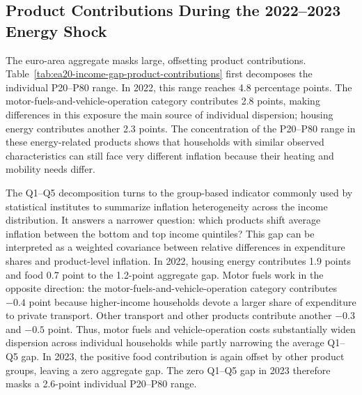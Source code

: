 \documentclass[11pt]{article}
\begin{document}
\subsection{Product Contributions During the 2022--2023 Energy Shock}



The euro-area aggregate masks large, offsetting product contributions.
Table~\ref{tab:ea20-income-gap-product-contributions} first decomposes the individual P20--P80
range. In 2022, this range reaches 4.8 percentage points. The motor-fuels-and-vehicle-operation
category contributes 2.8 points, making differences in this exposure the main source of
individual dispersion; housing energy contributes another 2.3 points. The concentration of the
P20--P80 range in these
energy-related products shows that households with similar observed characteristics can still face
very different inflation because their heating and mobility needs differ.

The Q1--Q5 decomposition turns to the group-based indicator commonly used by statistical institutes
to summarize inflation heterogeneity across the income distribution. It answers a narrower question:
which products shift average inflation between the bottom and top income quintiles? This gap can be interpreted as a weighted covariance
between relative differences in expenditure shares and product-level inflation. In 2022, housing
energy contributes 1.9 points and food 0.7 point to the 1.2-point aggregate gap. Motor fuels work in
the opposite direction: the motor-fuels-and-vehicle-operation category contributes $-0.4$ point because
higher-income households devote a larger share of expenditure to private transport. Other transport
and other products contribute another $-0.3$ and $-0.5$ point. Thus, motor fuels and
vehicle-operation costs substantially widen dispersion across individual households while partly
narrowing the average Q1--Q5 gap. In 2023, the
positive food contribution is again offset by other product groups, leaving a zero aggregate gap.
The zero Q1--Q5 gap in 2023 therefore masks a 2.6-point individual P20--P80 range.



\end{document}

